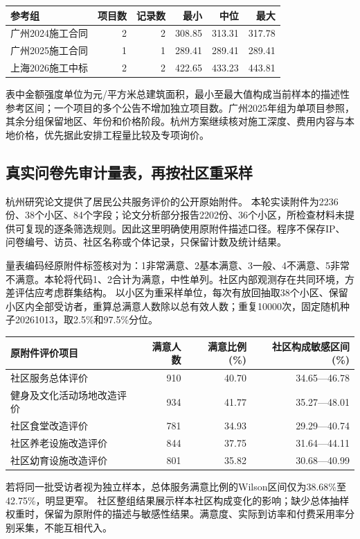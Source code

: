 \documentclass[UTF8,11pt,fontset=windows]{ctexart}
\begin{document}
\begin{center}\small
\begin{tabular}{@{}L{37mm}rrrrr@{}}
\toprule 参考组 & 项目数 & 记录数 & 最小 & 中位 & 最大\\\midrule

广州2024施工合同 & 2 & 2 & 308.85 & 313.31 & 317.78\\
广州2025施工合同 & 1 & 1 & 289.41 & 289.41 & 289.41\\
上海2026施工中标 & 2 & 2 & 422.65 & 433.23 & 443.81\\

\bottomrule\end{tabular}\end{center}
表中金额强度单位为元/平方米总建筑面积，最小至最大值构成当前样本的描述性参考区间；一个项目的多个公告不增加独立项目数。广州2025年组为单项目参照，其余分组保留地区、年份和价格阶段。杭州方案继续核对施工深度、费用内容与本地价格，优先据此安排工程量比较及专项询价。\cite{gzyouth,gzhong,shcang,shsea}

\subsection{真实问卷先审计量表，再按社区重采样}

杭州研究论文提供了居民公共服务评价的公开原始附件。\cite{hangzhou2026} 本轮实读附件为2236份、38个小区、84个字段；论文分析部分报告2202份、36个小区，所检查材料未提供可复现的逐条筛选规则。因此这里明确使用原附件描述口径。程序不保存IP、问卷编号、访员、社区名称或个体记录，只保留计数及统计结果。

量表编码经原附件标签核对为：1非常满意、2基本满意、3一般、4不满意、5非常不满意。本轮将代码1、2合计为满意，中性单列。社区内部观测存在共同环境，方差评估应考虑群集结构。\cite{cdcvariance} 以小区为重采样单位，每次有放回抽取38个小区、保留小区内全部受访者，重算总满意人数除以总有效人数；重复10000次，固定随机种子20261013，取2.5\%和97.5\%分位。

\begin{center}\small
\begin{tabular}{@{}L{48mm}rrr@{}}
\toprule 原附件评价项目 & 满意人数 & 满意比例(\%) & 社区构成敏感区间(\%)\\\midrule

社区服务总体评价 & 910 & 40.70 & 34.65—46.78\\
健身及文化活动场地改造评价 & 934 & 41.77 & 35.27—48.01\\
社区食堂改造评价 & 781 & 34.93 & 29.29—40.74\\
社区养老设施改造评价 & 844 & 37.75 & 31.64—44.11\\
社区幼育设施改造评价 & 801 & 35.82 & 30.68—40.99\\
\bottomrule\end{tabular}\end{center}
若将同一批受访者视为独立样本，总体服务满意比例的Wilson区间仅为38.68\%至42.75\%，明显更窄。\cite{nistwilson} 社区整组结果展示样本社区构成变化的影响；缺少总体抽样权重时，保留为原附件的描述与敏感性结果。满意度、实际到访率和付费采用率分别采集，不能互相代入。
\end{document}
